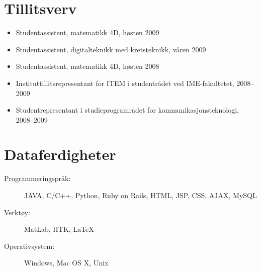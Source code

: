 \documentclass[overlapped,line,a4paper]{res}
\begin{document}
\begin{resume}

\section{\bf{Tillitsverv}}

\begin{itemize}
	\item Studentassistent, matematikk 4D, høsten 2009
	\item Studentassistent, digitalteknikk med kretsteknikk, våren 2009
	\item Studentassistent, matematikk 4D, høsten 2008
	\item Instituttillitsrepresentant for ITEM i studentrådet ved IME-fakultetet, 2008--2009
	\item Studentrepresentant i studieprogramrådet for kommunikasjonsteknologi, 2008--2009
\end{itemize}


\section{\bf{Dataferdigheter}}
\begin{description}
	\item[Programmeringspråk:] JAVA, C/C++, Python, Ruby on Rails, HTML, JSP, CSS, AJAX, MySQL
	\item[Verktøy:] MatLab, HTK, \LaTeX 
	\item[Operativsystem:] Windows, Mac OS X, Unix
\end{description}

\end{resume}
\end{document}
